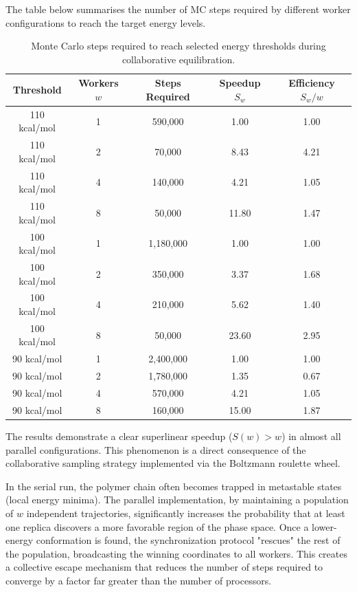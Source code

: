 The table below summarises the number of MC steps required by different
worker configurations to reach the target energy levels.

\begin{table}[H]
\centering
\begin{tabular}{ccccc}
\toprule
Threshold & Workers \(w\) & Steps Required & Speedup \(S_w\) & Efficiency \(S_w / w\) \\
\midrule
110 kcal/mol & 1 & 590,000  & 1.00  & 1.00 \\
110 kcal/mol & 2 & 70,000   & 8.43  & 4.21 \\
110 kcal/mol & 4 & 140,000  & 4.21  & 1.05 \\
110 kcal/mol & 8 & 50,000   & 11.80 & 1.47 \\
\midrule
100 kcal/mol & 1 & 1,180,000 & 1.00  & 1.00 \\
100 kcal/mol & 2 & 350,000   & 3.37  & 1.68 \\
100 kcal/mol & 4 & 210,000   & 5.62  & 1.40 \\
100 kcal/mol & 8 & 50,000    & 23.60 & 2.95 \\
\midrule
90 kcal/mol & 1 & 2,400,000 & 1.00  & 1.00 \\
90 kcal/mol & 2 & 1,780,000 & 1.35  & 0.67 \\
90 kcal/mol & 4 & 570,000   & 4.21  & 1.05 \\
90 kcal/mol & 8 & 160,000   & 15.00 & 1.87 \\
\bottomrule
\end{tabular}
\caption{Monte Carlo steps required to reach selected energy thresholds during collaborative equilibration.}
\end{table}

The results demonstrate a clear superlinear speedup ($S(w) > w$) in almost all parallel configurations. This phenomenon is a direct consequence of the collaborative sampling strategy implemented via the Boltzmann roulette wheel.

In the serial run, the polymer chain often becomes trapped in metastable states (local energy minima). The parallel implementation, by maintaining a population of $w$ independent trajectories, significantly increases the probability that at least one replica discovers a more favorable region of the phase space. Once a lower-energy conformation is found, the synchronization protocol "rescues" the rest of the population, broadcasting the winning coordinates to all workers. This creates a collective escape mechanism that reduces the number of steps required to converge by a factor far greater than the number of processors.

